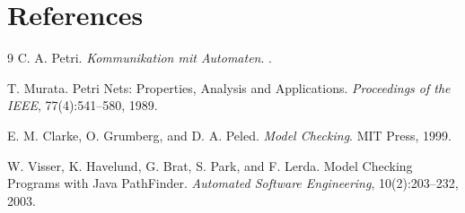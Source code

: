 \clearpage
\section{References}

\begin{thebibliography}{9}
    C. A. Petri.
    \newblock \emph{Kommunikation mit Automaten}.
    .

    T. Murata.
    \newblock Petri Nets: Properties, Analysis and Applications.
    \newblock \emph{Proceedings of the IEEE}, 77(4):541--580, 1989.

    E. M. Clarke, O. Grumberg, and D. A. Peled.
    \newblock \emph{Model Checking}.
    \newblock MIT Press, 1999.

    W. Visser, K. Havelund, G. Brat, S. Park, and F. Lerda.
    \newblock Model Checking Programs with Java PathFinder.
    \newblock \emph{Automated Software Engineering}, 10(2):203--232, 2003.
\end{thebibliography}